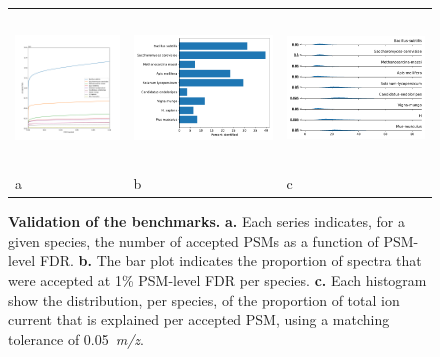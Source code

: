 \documentclass{article}
\begin{document}
\begin{figure}
  \centering
  \begin{tabular}{lll}
    \includegraphics[height=1.6in]{nine-species-fdrs.pdf} &
    \includegraphics[height=1.6in]{percent-id.pdf}  &
    \includegraphics[height=1.6in]{match-by.pdf}  \\
    a & b & c \\
  \end{tabular}
  \caption{\textbf{Validation of the benchmarks.}
    \textbf{a.} Each series indicates, for a given species, the number of accepted PSMs as a function of PSM-level FDR.
    \textbf{b.} The bar plot indicates the proportion of spectra that were accepted at 1\% PSM-level FDR per species.
    \textbf{c.} Each histogram show the distribution, per species, of the proportion of total ion current that is explained per accepted PSM, using a matching tolerance of 0.05~\textit{m/z}.}
  \label{fig:fdr}
\end{figure}
\end{document}
